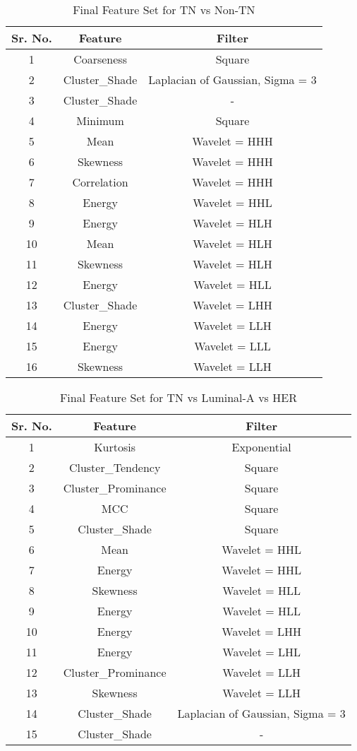 \documentclass[10pt,final,1p,times,twocolumn]{elsarticle}
\begin{document}
\begin{table}[!b]
\centering
\caption{Final Feature Set for TN vs Non-TN}
\label{tb1}
\begin{tabular}{| c | c | c |}
\hline
Sr. No. & Feature & Filter\\
\hline
1 & Coarseness & Square\\
\hline
2 & Cluster\_Shade & Laplacian of Gaussian, Sigma = 3\\
\hline
3& Cluster\_Shade & - \\
\hline
4& Minimum & Square\\
\hline
5& Mean & Wavelet = HHH \\
\hline
6& Skewness & Wavelet = HHH\\
\hline
7& Correlation & Wavelet = HHH\\
\hline
8& Energy & Wavelet = HHL\\
\hline
9& Energy & Wavelet = HLH\\
\hline
10& Mean & Wavelet = HLH\\
\hline
11& Skewness & Wavelet = HLH\\
\hline
12& Energy & Wavelet = HLL\\
\hline
13& Cluster\_Shade & Wavelet = LHH\\
\hline
14& Energy & Wavelet = LLH\\
\hline
15& Energy & Wavelet = LLL\\
\hline
16& Skewness & Wavelet = LLH\\
\hline
\end{tabular}
\end{table}

\begin{table}[!b]
\centering
\caption{Final Feature Set for TN vs Luminal-A vs HER}
\label{tb2}
\begin{tabular}{| c | c | c |}
\hline
Sr. No. & Feature & Filter\\
\hline
1 & Kurtosis & Exponential\\
\hline
2 & Cluster\_Tendency & Square\\
\hline
3& Cluster\_Prominance & Square \\
\hline
4& MCC & Square\\
\hline
5& Cluster\_Shade & Square \\
\hline
6& Mean & Wavelet = HHL\\
\hline
7& Energy & Wavelet = HHL\\
\hline
8& Skewness & Wavelet = HLL\\
\hline
9& Energy & Wavelet = HLL\\
\hline
10& Energy & Wavelet = LHH\\
\hline
11& Energy & Wavelet = LHL\\
\hline
12& Cluster\_Prominance & Wavelet = LLH\\
\hline
13& Skewness & Wavelet = LLH\\
\hline
14& Cluster\_Shade & Laplacian of Gaussian, Sigma = 3\\
\hline
15& Cluster\_Shade & -\\
\hline
\end{tabular}
\end{table}
\end{document}
